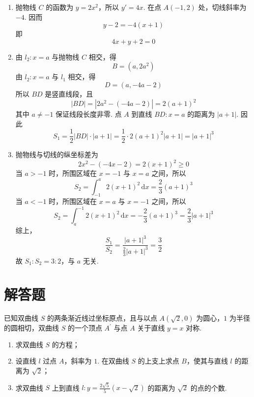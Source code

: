 \documentclass[UTF8,a4paper,oneside,11pt]{ctexbook}
\begin{document}
\begin{solution}
\begin{enumerate}
\item 抛物线 \(C\) 的函数为 \(y=2x^2\)，所以
\(y'=4x\). 在点 \(A(-1,2)\) 处，切线斜率为 \(-4\). 因而
\[
y-2=-4(x+1)
\]
即
\[
4x+y+2=0
\]

\item 由 \(l_2:x=a\) 与抛物线 \(C\) 相交，得
\[
B=(a,2a^2)
\]
由 \(l_2:x=a\) 与 \(l_1\) 相交，得
\[
D=(a,-4a-2)
\]
所以 \(BD\) 是竖直线段，且
\[
|BD|=\left|2a^2-(-4a-2)\right|
=2(a+1)^2
\]
其中 \(a\neq-1\) 保证线段长度非零. 点 \(A\) 到直线 \(BD:x=a\) 的距离为
\(|a+1|\). 因此
\[
S_1=\frac{1}{2}|BD|\cdot|a+1|
=\frac{1}{2}\cdot2(a+1)^2|a+1|
=|a+1|^3
\]

\item 抛物线与切线的纵坐标差为
\[
2x^2-(-4x-2)=2(x+1)^2\geq0
\]
当 \(a>-1\) 时，所围区域在 \(x=-1\) 与 \(x=a\) 之间，所以
\[
S_2=\int_{-1}^{a}2(x+1)^2\,\mathrm{d}x
=\frac{2}{3}(a+1)^3
\]
当 \(a<-1\) 时，所围区域在 \(x=a\) 与 \(x=-1\) 之间，所以
\[
S_2=\int_{a}^{-1}2(x+1)^2\,\mathrm{d}x
=-\frac{2}{3}(a+1)^3
=\frac{2}{3}|a+1|^3
\]
综上，
\[
\frac{S_1}{S_2}
=\frac{|a+1|^3}{\frac{2}{3}|a+1|^3}
=\frac{3}{2}
\]
故 \(S_1:S_2=3:2\)，与 \(a\) 无关.
\end{enumerate}
\end{solution}

\section{解答题}

\begin{problem}
已知双曲线 \(S\) 的两条渐近线过坐标原点，且与以点 \(A(\sqrt{2},0)\) 为圆心，\(1\) 为半径的圆相切，双曲线 \(S\) 的一个顶点 \(A^\prime\) 与点 \(A\) 关于直线 \(y=x\) 对称.

\begin{enumerate}
\item 求双曲线 \(S\) 的方程；
\item 设直线 \(l\) 过点 \(A\)，斜率为 \(1\). 在双曲线 \(S\) 的上支上求点 \(B\)，使其与直线 \(l\) 的距离为 \(\sqrt{2}\)；
\item 求双曲线 \(S\) 上到直线 \(l:y=\frac{2\sqrt{5}}{5}\left(x-\sqrt{2}\right)\) 的距离为 \(\sqrt{2}\) 的点的个数.
\end{enumerate}

\end{problem}
\end{document}
